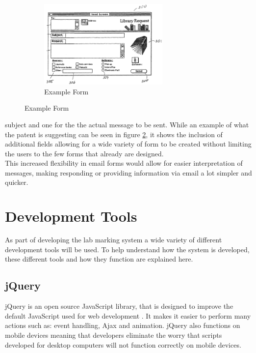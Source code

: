 \documentclass[11pt]{report}
\begin{document}
\begin{figure}
\vspace*{-\baselineskip}
\begin{figure}[H]
\includegraphics[width=0.7\textwidth]{images/emailform.png}
	\caption{Example Form \cite{holt_customizing_2006-1}}
	\label{fig:emailform}
\end{figure}
\end{figure}

\noindent subject and one for the the actual message to be sent. While an example of what the patent is suggesting can be seen in figure \ref{fig:emailform}, it shows the inclusion of additional fields allowing for a wide variety of form to be created without limiting the users to  the few forms that already are designed.\\
This increased flexibility in email forms would allow for easier  interpretation of messages, making responding or providing information via email a lot simpler and quicker.


\section{Development Tools}

As part of developing the lab marking system  a wide variety of different development tools will be used. To help understand how the system is developed, these different tools and how they function are explained here.  



\subsection{jQuery} \label{sec:jquery}
jQuery is an open source JavaScript library, that is designed to improve the default JavaScript used for web development \cite{jquery.org_jquery_????-1}. It makes it easier to perform many actions such as: event handling, Ajax and animation. jQuery also functions on mobile devices meaning that developers eliminate the worry that scripts developed for desktop computers will not function correctly on mobile devices.  
\end{document}
